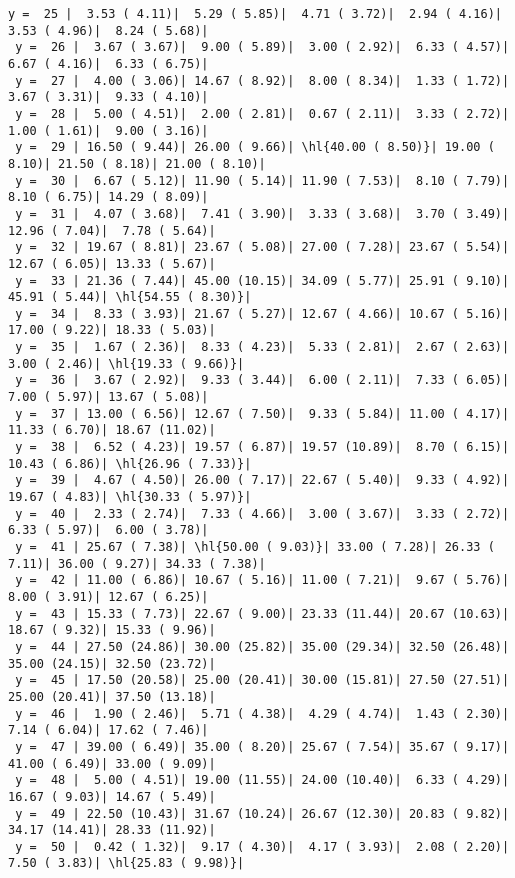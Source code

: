 \documentclass[10pt]{article}
\newcommand{\hl}[1]{\textcolor{blue}{#1}}
\begin{document}
\begin{Verbatim}[fontsize=\small, commandchars=\\\{\}]
 y =  25 |  3.53 ( 4.11)|  5.29 ( 5.85)|  4.71 ( 3.72)|  2.94 ( 4.16)|  3.53 ( 4.96)|  8.24 ( 5.68)|
 y =  26 |  3.67 ( 3.67)|  9.00 ( 5.89)|  3.00 ( 2.92)|  6.33 ( 4.57)|  6.67 ( 4.16)|  6.33 ( 6.75)|
 y =  27 |  4.00 ( 3.06)| 14.67 ( 8.92)|  8.00 ( 8.34)|  1.33 ( 1.72)|  3.67 ( 3.31)|  9.33 ( 4.10)|
 y =  28 |  5.00 ( 4.51)|  2.00 ( 2.81)|  0.67 ( 2.11)|  3.33 ( 2.72)|  1.00 ( 1.61)|  9.00 ( 3.16)|
 y =  29 | 16.50 ( 9.44)| 26.00 ( 9.66)| \hl{40.00 ( 8.50)}| 19.00 ( 8.10)| 21.50 ( 8.18)| 21.00 ( 8.10)|
 y =  30 |  6.67 ( 5.12)| 11.90 ( 5.14)| 11.90 ( 7.53)|  8.10 ( 7.79)|  8.10 ( 6.75)| 14.29 ( 8.09)|
 y =  31 |  4.07 ( 3.68)|  7.41 ( 3.90)|  3.33 ( 3.68)|  3.70 ( 3.49)| 12.96 ( 7.04)|  7.78 ( 5.64)|
 y =  32 | 19.67 ( 8.81)| 23.67 ( 5.08)| 27.00 ( 7.28)| 23.67 ( 5.54)| 12.67 ( 6.05)| 13.33 ( 5.67)|
 y =  33 | 21.36 ( 7.44)| 45.00 (10.15)| 34.09 ( 5.77)| 25.91 ( 9.10)| 45.91 ( 5.44)| \hl{54.55 ( 8.30)}|
 y =  34 |  8.33 ( 3.93)| 21.67 ( 5.27)| 12.67 ( 4.66)| 10.67 ( 5.16)| 17.00 ( 9.22)| 18.33 ( 5.03)|
 y =  35 |  1.67 ( 2.36)|  8.33 ( 4.23)|  5.33 ( 2.81)|  2.67 ( 2.63)|  3.00 ( 2.46)| \hl{19.33 ( 9.66)}|
 y =  36 |  3.67 ( 2.92)|  9.33 ( 3.44)|  6.00 ( 2.11)|  7.33 ( 6.05)|  7.00 ( 5.97)| 13.67 ( 5.08)|
 y =  37 | 13.00 ( 6.56)| 12.67 ( 7.50)|  9.33 ( 5.84)| 11.00 ( 4.17)| 11.33 ( 6.70)| 18.67 (11.02)|
 y =  38 |  6.52 ( 4.23)| 19.57 ( 6.87)| 19.57 (10.89)|  8.70 ( 6.15)| 10.43 ( 6.86)| \hl{26.96 ( 7.33)}|
 y =  39 |  4.67 ( 4.50)| 26.00 ( 7.17)| 22.67 ( 5.40)|  9.33 ( 4.92)| 19.67 ( 4.83)| \hl{30.33 ( 5.97)}|
 y =  40 |  2.33 ( 2.74)|  7.33 ( 4.66)|  3.00 ( 3.67)|  3.33 ( 2.72)|  6.33 ( 5.97)|  6.00 ( 3.78)|
 y =  41 | 25.67 ( 7.38)| \hl{50.00 ( 9.03)}| 33.00 ( 7.28)| 26.33 ( 7.11)| 36.00 ( 9.27)| 34.33 ( 7.38)|
 y =  42 | 11.00 ( 6.86)| 10.67 ( 5.16)| 11.00 ( 7.21)|  9.67 ( 5.76)|  8.00 ( 3.91)| 12.67 ( 6.25)|
 y =  43 | 15.33 ( 7.73)| 22.67 ( 9.00)| 23.33 (11.44)| 20.67 (10.63)| 18.67 ( 9.32)| 15.33 ( 9.96)|
 y =  44 | 27.50 (24.86)| 30.00 (25.82)| 35.00 (29.34)| 32.50 (26.48)| 35.00 (24.15)| 32.50 (23.72)|
 y =  45 | 17.50 (20.58)| 25.00 (20.41)| 30.00 (15.81)| 27.50 (27.51)| 25.00 (20.41)| 37.50 (13.18)|
 y =  46 |  1.90 ( 2.46)|  5.71 ( 4.38)|  4.29 ( 4.74)|  1.43 ( 2.30)|  7.14 ( 6.04)| 17.62 ( 7.46)|
 y =  47 | 39.00 ( 6.49)| 35.00 ( 8.20)| 25.67 ( 7.54)| 35.67 ( 9.17)| 41.00 ( 6.49)| 33.00 ( 9.09)|
 y =  48 |  5.00 ( 4.51)| 19.00 (11.55)| 24.00 (10.40)|  6.33 ( 4.29)| 16.67 ( 9.03)| 14.67 ( 5.49)|
 y =  49 | 22.50 (10.43)| 31.67 (10.24)| 26.67 (12.30)| 20.83 ( 9.82)| 34.17 (14.41)| 28.33 (11.92)|
 y =  50 |  0.42 ( 1.32)|  9.17 ( 4.30)|  4.17 ( 3.93)|  2.08 ( 2.20)|  7.50 ( 3.83)| \hl{25.83 ( 9.98)}|

\end{Verbatim}
\end{document}
